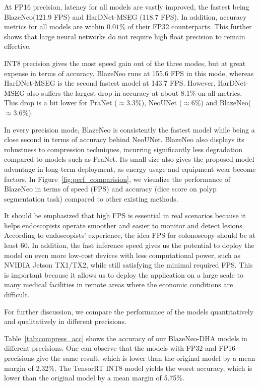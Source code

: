 \documentclass{ieeeaccess}
\newcommand{\ModelName}{BlazeNeo\xspace}
\newcommand{\DHA}{BlazeNeo-DHA\xspace}
\begin{document}
At FP16 precision, latency for all models are vastly improved, the fastest being \ModelName (121.9 FPS) and HarDNet-MSEG (118.7 FPS). In addition, accuracy metrics for all models are within $0.01\%$ of their FP32 counterparts. This further shows that large neural networks do not require high float precision to remain effective.

INT8 precision gives the most speed gain out of the three modes, but at great expense in terms of accuracy. \ModelName runs at 155.6 FPS in this mode, whereas HarDNet-MSEG is the second fastest model at 143.7 FPS. However, HarDNet-MSEG also suffers the largest drop in accuracy at about $8.1\%$ on all metrics. This drop is a bit lower for PraNet ($\approx 3.3\%$), NeoUNet ($\approx 6\%$) and \ModelName ($\approx 3.6\%$).

In every precision mode, \ModelName is consistently the fastest model while being a close second in terms of accuracy behind NeoUNet. \ModelName also displays its robustness to compression techniques, incurring significantly less degradation compared to models such as PraNet. Its small size also gives the proposed model advantage in long-term deployment, as energy usage and equipment wear become factors. In Figure~\ref{fig:perf_comparision}, we visualize the performance of BlazeNeo in terms of speed (FPS) and accuracy (dice score on polyp segmentation task) compared to other existing methods.

It should be emphasized that high FPS is essential in real scenarios because it helps endoscopists operate smoother and easier to monitor and detect lesions. According to endoscopists' experience, the idea FPS for colonoscopy should be at least 60. In addition, the fast inference speed gives us the potential to deploy the model on even more low-cost devices with less computational power, such as NVIDIA Jetson TX1/TX2, while still satisfying the minimal required FPS. This is important because it allows us to deploy the application on a large scale to many medical facilities in remote areas where the economic conditions are difficult.





For further discussion, we compare the performance of the models quantitatively and qualitatively in different precisions.


Table~\ref{tab:compress_acc} shows the accuracy of our \DHA models in different precisions. One can observe that the models with FP32 and FP16 precisions give the same result, which is lower than the original model by a mean margin of 2.32\%. The TensorRT INT8 model yields the worst accuracy, which is lower than the original model by a mean margin of 5.75\%.
\end{document}
